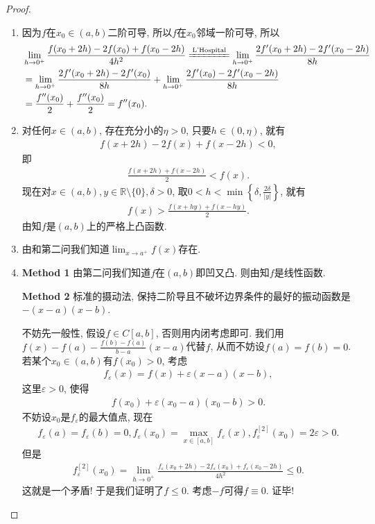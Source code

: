 \documentclass[../../main.tex]{subfiles}
\begin{document}
\begin{proof}
\begin{enumerate}
\item 因为$f$在$x_0 \in (a,b)$二阶可导, 所以$f$在$x_0$邻域一阶可导, 所以
\begin{align*}
&\lim_{h \to 0^+} \frac{f(x_0 + 2h) - 2f(x_0) + f(x_0 - 2h)}{4h^2} \xlongequal{\text{L'Hospital}} \lim_{h \to 0^+} \frac{2f'(x_0 + 2h) - 2f'(x_0 - 2h)}{8h} \\
&= \lim_{h \to 0^+} \frac{2f'(x_0 + 2h) - 2f'(x_0)}{8h} + \lim_{h \to 0^+} \frac{2f'(x_0) - 2f'(x_0 - 2h)}{8h} \\
&= \frac{f''(x_0)}{2} + \frac{f''(x_0)}{2} = f''(x_0).
\end{align*}

\item 对任何$x \in (a,b)$, 存在充分小的$\eta > 0$, 只要$h \in (0,\eta)$, 就有
\begin{align*}
f(x + 2h) - 2f(x) + f(x - 2h) < 0,
\end{align*}
即
\begin{align*}
\frac{f(x + 2h) + f(x - 2h)}{2} < f(x).
\end{align*}
现在对$x \in (a,b), y \in \mathbb{R} \setminus \{0\}, \delta > 0$, 取$0 < h < \min\left\{\delta, \frac{2\delta}{|y|}\right\}$, 就有
\begin{align*}
f(x) > \frac{f(x + hy) + f(x - hy)}{2}.
\end{align*}
由知$f$是$(a,b)$上的严格上凸函数.

\item  由和第二问我们知道$\lim_{x \to a^+} f(x)$存在.

\item  \textbf{Method 1} 由第二问我们知道$f$在$(a,b)$即凹又凸. 则由知$f$是线性函数.

\textbf{Method 2} 标准的摄动法, 保持二阶导且不破坏边界条件的最好的振动函数是$-(x - a)(x - b)$.

不妨先一般性, 假设$f \in C[a,b]$, 否则用内闭考虑即可. 
我们用$f(x) - f(a) - \frac{f(b) - f(a)}{b - a}(x - a)$代替$f$, 从而不妨设$f(a) = f(b) = 0$. 若某个$x_0 \in (a,b)$有$f(x_0) > 0$, 考虑
\begin{align*}
f_\varepsilon(x) = f(x) + \varepsilon(x - a)(x - b),
\end{align*}
这里$\varepsilon > 0$, 使得
\begin{align*}
f(x_0) + \varepsilon(x_0 - a)(x_0 - b) > 0.
\end{align*}
不妨设$x_0$是$f_\varepsilon$的最大值点, 现在
\begin{align*}
f_\varepsilon(a) = f_\varepsilon(b) = 0, f_\varepsilon(x_0) = \max_{x \in [a,b]} f_\varepsilon(x), f_\varepsilon^{[2]}(x_0) = 2\varepsilon > 0.
\end{align*}
但是
\begin{align*}
f_\varepsilon^{[2]}(x_0) = \lim_{h \to 0^+} \frac{f_\varepsilon(x_0 + 2h) - 2f_\varepsilon(x_0) + f_\varepsilon(x_0 - 2h)}{4h^2} \leqslant 0.
\end{align*}
这就是一个矛盾! 于是我们证明了$f \leqslant 0$. 考虑$-f$可得$f \equiv 0$. 证毕!
\end{enumerate}


\end{proof}
\end{document}
